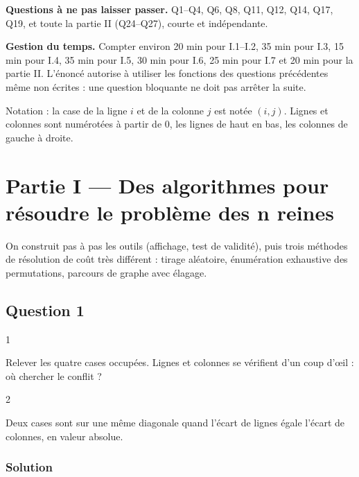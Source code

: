 \documentclass[11pt,a4paper]{article}
\begin{document}
\textbf{Questions à ne pas laisser passer.} Q1--Q4, Q6, Q8, Q11, Q12, Q14, Q17, Q19, et toute la partie II (Q24--Q27), courte et indépendante.

\textbf{Gestion du temps.} Compter environ 20 min pour I.1--I.2, 35 min pour I.3, 15 min pour I.4, 35 min pour I.5, 30 min pour I.6, 25 min pour I.7 et 20 min pour la partie II. L'énoncé autorise à utiliser les fonctions des questions précédentes même non écrites : une question bloquante ne doit pas arrêter la suite.

Notation : la case de la ligne \(i\) et de la colonne \(j\) est notée \((i, j)\). Lignes et colonnes sont numérotées à partir de \(0\), les lignes de haut en bas, les colonnes de gauche à droite.

\hypertarget{partie-i-des-algorithmes-pour-ruxe9soudre-le-probluxe8me-des-n-reines}{%
\section{Partie I --- Des algorithmes pour résoudre le problème des n reines}\label{partie-i-des-algorithmes-pour-ruxe9soudre-le-probluxe8me-des-n-reines}}

On construit pas à pas les outils (affichage, test de validité), puis trois méthodes de résolution de coût très différent : tirage aléatoire, énumération exhaustive des permutations, parcours de graphe avec élagage.

\hypertarget{question-1}{%
\subsection{Question 1}\label{question-1}}

\begin{indication}{1}

Relever les quatre cases occupées. Lignes et colonnes se vérifient d'un coup d'œil : où chercher le conflit ?

\end{indication}

\begin{indication}{2}

Deux cases sont sur une même diagonale quand l'écart de lignes égale l'écart de colonnes, en valeur absolue.

\end{indication}

\hypertarget{solution}{%
\subsubsection{Solution}\label{solution}}
\end{document}
